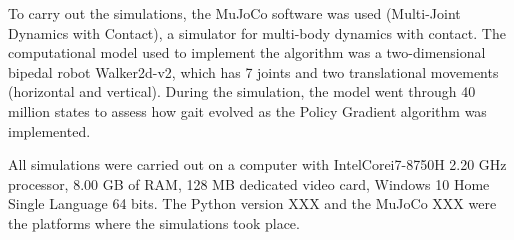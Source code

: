 To carry out the simulations, the MuJoCo software was used (Multi-Joint Dynamics with Contact), a simulator for multi-body dynamics with contact. The computational model used to implement the algorithm was a two-dimensional bipedal robot Walker2d-v2, which has 7 joints and two translational movements (horizontal and vertical). During the simulation, the model went through 40 million states to assess how gait evolved as the Policy Gradient algorithm was implemented.

All simulations were carried out on a computer with Intel\textregistered Core\texttrademark i7-8750H 2.20 GHz processor, 8.00 GB of RAM, 128 MB dedicated video card, Windows 10 Home Single Language 64 bits. The Python version XXX and the MuJoCo XXX were the platforms where the simulations took place.
